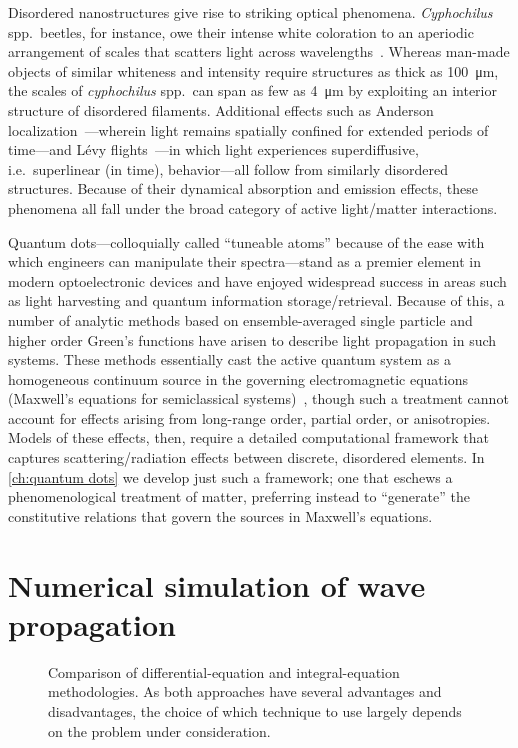 Disordered nanostructures give rise to striking optical phenomena.
\emph{Cyphochilus} spp.\ beetles, for instance, owe their intense white coloration to an aperiodic arrangement of scales that scatters light across wavelengths~\cite{Vukusic2007}.
Whereas man-made objects of similar whiteness and intensity require structures as thick as \SI{100}{\micro\meter}, the scales of \emph{cyphochilus} spp.\ can span as few as \SI{4}{\micro\meter} by exploiting an interior structure of disordered filaments.
Additional effects such as Anderson localization~\cite{Anderson1985}---wherein light remains spatially confined for extended periods of time---and L\'evy flights~\cite{Barthelemy2008}---in which light experiences superdiffusive, i.e.\ superlinear (in time), behavior---all follow from similarly disordered structures.
Because of their dynamical absorption and emission effects, these phenomena all fall under the broad category of active light/matter interactions.

Quantum dots---colloquially called ``tuneable atoms'' because of the ease with which engineers can manipulate their spectra---stand as a premier element in modern optoelectronic devices and have enjoyed widespread success in areas such as light harvesting and quantum information storage/retrieval.
Because of this, a number of analytic methods based on ensemble-averaged single particle and higher order Green's functions have arisen to describe light propagation in such systems.
These methods essentially cast the active quantum system as a homogeneous continuum source in the governing electromagnetic equations (Maxwell's equations for semiclassical systems)~\cite{Arecchi1965}, though such a treatment cannot account for effects arising from long-range order, partial order, or anisotropies.
Models of these effects, then, require a detailed computational framework that captures scattering/radiation effects between discrete, disordered elements.
In \cref{ch:quantum dots} we develop just such a framework; one that eschews a phenomenological treatment of matter, preferring instead to ``generate'' the constitutive relations that govern the sources in Maxwell's equations.

\section{Numerical simulation of wave propagation}

\begin{figure}
  \centering
  \caption{\label{fig:mindmap} Comparison of differential-equation and integral-equation methodologies.
    As both approaches have several advantages and disadvantages, the choice of which technique to use largely depends on the problem under consideration.
  }
\end{figure}

